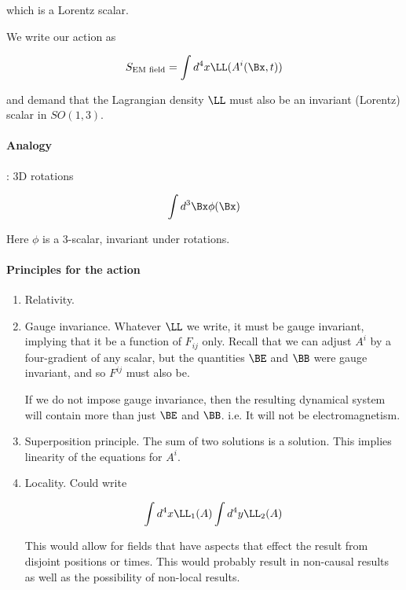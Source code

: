 which is a Lorentz scalar.

We write our action as 

\begin{equation}\label{eqn:relativisticElectrodynamicsL12b:170}
S_{\text{EM field}} = \int d^4 x \LL(A^i(\Bx, t))
\end{equation}

and demand that the Lagrangian density \(\LL\) must also be an invariant (Lorentz) scalar in \(SO(1,3)\).

\paragraph{Analogy}: 3D rotations

\begin{equation}\label{eqn:relativisticElectrodynamicsL12b:190}
\int d^3 \Bx \phi(\Bx)
\end{equation}

Here \(\phi\) is a 3-scalar, invariant under rotations.

\paragraph{Principles for the action}

\begin{enumerate}
\item Relativity.
\item Gauge invariance.  Whatever \(\LL\) we write, it must be gauge invariant, implying that it be a function of \(F_{ij}\) only.  Recall that we can adjust \(A^i\) by a four-gradient of any scalar, but the quantities \(\BE\) and \(\BB\) were gauge invariant, and so \(F^{ij}\) must also be.

If we do not impose gauge invariance, then the resulting dynamical system will contain more than just \(\BE\) and \(\BB\).  i.e. It will not be electromagnetism.

\item Superposition principle.  The sum of two solutions is a solution.  This implies linearity of the equations for \(A^i\).

\item Locality.  Could write

\begin{equation}\label{eqn:relativisticElectrodynamicsL12b:210}
\int d^4 x \LL_1(A) \int d^4 y \LL_2(A)
\end{equation}

This would allow for fields that have aspects that effect the result from disjoint positions or times.  This would probably result in non-causal results as well as the possibility of non-local results.
\end{enumerate}

